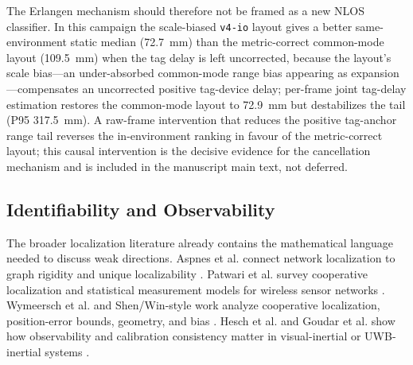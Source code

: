 \documentclass[11pt,a4paper]{article}
\begin{document}
The Erlangen mechanism should therefore not be framed as a new NLOS classifier. In this campaign the scale-biased \texttt{v4-io} layout gives a better same-environment static median (72.7~mm) than the metric-correct common-mode layout (109.5~mm) when the tag delay is left uncorrected, because the layout's scale bias---an under-absorbed common-mode range bias appearing as expansion---compensates an uncorrected positive tag-device delay; per-frame joint tag-delay estimation restores the common-mode layout to 72.9~mm but destabilizes the tail (P95 317.5~mm). A raw-frame intervention that reduces the positive tag-anchor range tail reverses the in-environment ranking in favour of the metric-correct layout; this causal intervention is the decisive evidence for the cancellation mechanism and is included in the manuscript main text, not deferred.

\subsection{Identifiability and Observability}

The broader localization literature already contains the mathematical language needed to discuss weak directions. Aspnes et al. connect network localization to graph rigidity and unique localizability \citep{aspnes_2006_theory_network_localization}. Patwari et al. survey cooperative localization and statistical measurement models for wireless sensor networks \citep{patwari_2005_locating_the_nodes}. Wymeersch et al. and Shen/Win-style work analyze cooperative localization, position-error bounds, geometry, and bias \citep{wymeersch_2009_cooperative_localization_wireless_networks,joudarwin_2008_position_error_bound_uwb}. Hesch et al. and Goudar et al. show how observability and calibration consistency matter in visual-inertial or UWB-inertial systems \citep{hesch_2014_camera_imu_observability,goudar_2021_online_spatiotemporal_calibration_uwb_imu}.
\end{document}
